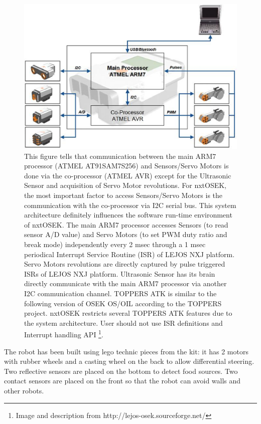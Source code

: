 \begin{figure}[htbp]
\begin{center}
\includegraphics[scale=0.6]{figures/legonxt/nxtsystem.eps}
\caption[ATMEL AVR architecture]{This figure tells that communication between the main ARM7 processor (ATMEL AT91SAM7S256) and Sensors/Servo Motors is done via the co-processor (ATMEL AVR) except for the Ultrasonic Sensor and acquisition of Servo Motor revolutions. For nxtOSEK, the most important factor to access Sensors/Servo Motors is the communication with the co-processor via I2C serial bus. This system architecture definitely influences the software run-time environment of nxtOSEK. The main ARM7 processor accesses Sensors (to read sensor A/D value) and Servo Motors (to set PWM duty ratio and break mode) independently every 2 msec through a 1 msec periodical Interrupt Service Routine (ISR) of LEJOS NXJ platform. Servo Motors revolutions are directly captured by pulse triggered ISRs of LEJOS NXJ platform. Ultrasonic Sensor has its brain directly communicate with the main ARM7 processor via another I2C communication channel. TOPPERS ATK is similar to the following version of OSEK OS/OIL according to the TOPPERS project.
nxtOSEK restricts several TOPPERS ATK features due to the system architecture. User should not use ISR definitions and Interrupt handling API \footnote{Image and description from  http://lejos-osek.sourceforge.net/}.}
\end{center}
\end{figure}

The robot has been built using lego technic pieces from the kit: it has 2 motors with rubber wheels and a casting wheel on the back to allow differential steering. Two reflective sensors are placed on the bottom to detect food sources. Two contact sensors are placed on the front so that the robot can avoid walls and other robots.

